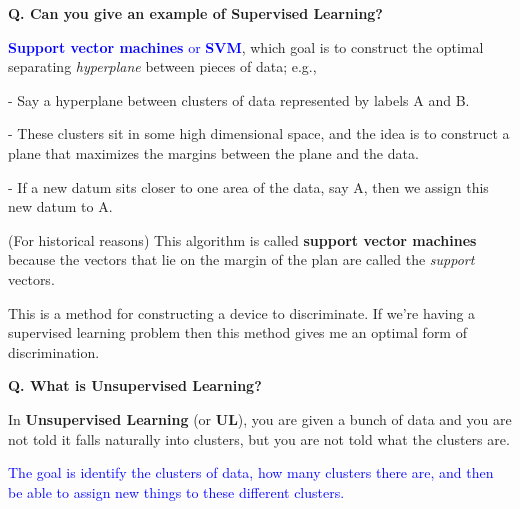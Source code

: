 \begin{frame}[fragile]{\textbf{Q. Can you give an example of Supervised Learning?}}
  \vspace{.4em}
  \begin{wideitemize}
    \item \textcolor{blue}{\textbf{Support vector machines} or \textbf{SVM}}, which
    goal is to construct the optimal separating \textit{hyperplane} between pieces of data; e.g.,
    \begin{wideitemize}
      \item[-] Say a hyperplane between clusters of data represented by labels A and B.
      \item[-] These clusters sit in some high dimensional space, and the idea is to
      construct a plane that maximizes the margins between the plane and the data.
      \item[-] If a new datum sits closer to one area of the data, say A, then
      we assign this new datum to A.
    \end{wideitemize}
    \item (For historical reasons) This algorithm is called \textbf{support
    vector machines} because the vectors that lie on the margin of the plan are
    called the \textit{support} vectors.
  \end{wideitemize}

  \begin{framed}
  This is a method for constructing a device to discriminate. If we're having
  a supervised learning problem then this method gives me an optimal form of
  discrimination.
  \end{framed}

\end{frame}


\begin{frame}[fragile]{\textbf{Q. What is Unsupervised Learning?}}
  \begin{wideitemize}
    \item In \textbf{Unsupervised Learning} (or \textbf{UL}), you are given a
    bunch of data and you are not told it falls naturally into clusters, but
    you are not told what the clusters are.
    \item \textcolor{blue}{The goal is identify the clusters of data, how many clusters there are,
    and then be able to assign new things to these different clusters.}
  \end{wideitemize}
\end{frame}

